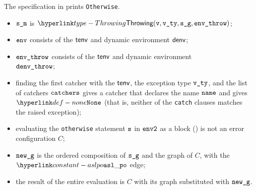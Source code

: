 \begin{mathpar}
\end{mathpar}

The specification in  prints \texttt{Otherwise}.

\ProseParagraph
\AllApply
\begin{itemize}
  \item $\sm$ is $\Throwing(\vv, \vvty, \sg, \envthrow)$;
  \item $\env$ consists of the \staticenvironmentterm{} $\tenv$ and dynamic environment $\denv$;
  \item $\envthrow$ consists of the \staticenvironmentterm{} $\tenv$ and dynamic environment \\ $\denvthrow$;
  \item finding the first catcher with the \staticenvironmentterm{} $\tenv$, the exception type $\vvty$,
        and the list of catchers $\catchers$ gives a catcher that declares the name $\name$ and gives $\None$
        (that is, neither of the \texttt{catch} clauses matches the raised exception);
  \item evaluating the \texttt{otherwise} statement $\vs$ in $\envtwo$ as a block ()
        is not an error configuration $C$\ProseOrDynErrorDiverging;
  \item $\newg$ is the ordered composition of $\sg$ and the graph of $C$,
        with the $\aslpo$ edge;
  \item the result of the entire evaluation is $C$ with its graph substituted with $\newg$.
\end{itemize}

